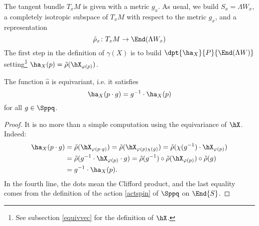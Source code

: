 The tangent bundle $T_xM$ is given with a metric $g_x$. As usual, we build $S_x=\Lambda W _x$, a completely isotropic subspace of $T_xM$ with respect to the metric $g_x$, and a representation
\[ 
\tilde \rho_x\colon T_xM\to \End(\Lambda W_x)
\]
The first step in the definition of $\gamma(X)$ is to build $\dpt{\ha_X}{P}{\End(\Lambda W )}$ setting\footnote{See subsection \ref{equivvec} for the definition of $\hX$.} $\ha_X(p)=\tilde\rho(\hX_{\varphi(p)})$.

\begin{lemma}
The function $\hat a$ is equivariant, i.e. it satisfies
\begin{equation}
     \ha_X(p\cdot g)=g^{-1}\cdot\ha_X(p)                             \label{equivaX}
\end{equation}
for all $g\in\Sppq$.
\end{lemma}

\begin{proof}
It is no more than a simple computation using the equivariance of $\hX$. Indeed:
\begin{equation}
\begin{split}
 \ha_X(p\cdot g)&=\tilde\rho(\hX_{\varphi(p\cdot g)})=\tilde\rho(\hX_{\varphi(p)\chi(g)})=\tilde\rho(\chi(g^{-1})\cdot\hX_{\varphi(p)})\\
		&=\tilde\rho(g^{-1}\cdot\hX_{\varphi(p)}\cdot g)=\tilde\rho(g^{-1})\circ\tilde\rho(\hX_{\varphi(p)})\circ\tilde\rho(g)\\
                &=g^{-1}\cdot\ha_X(p).
\end{split}
\end{equation}
In the fourth line, the dots mean the Clifford product, and the last equality comes from the definition of the action \eqref{actspin} of $\Sppq$ on $\End{S}$.
\end{proof}

